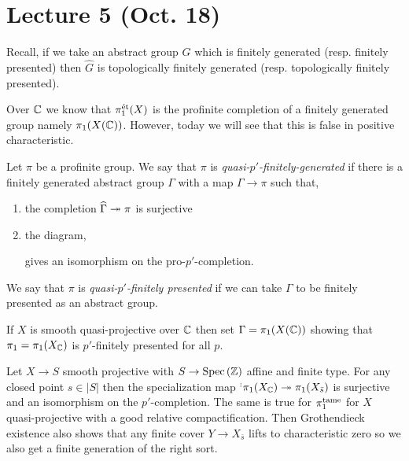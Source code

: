 \documentclass[12pt]{article}
\begin{document}
\section{Lecture 5 (Oct. 18)}

\begin{rmk}
Recall, if we take an abstract group $G$ which is finitely generated (resp. finitely presented) then $\widehat{G}$ is topologically finitely generated (resp. topologically finitely presented). 
\end{rmk}

\begin{prop}
Over $\mathbb{C}$ we know that $\pi_1^{\text{\'{e}t}}(X)$ is the profinite completion of a finitely generated group namely $\pi_1(X(\mathbb{C}))$. However, today we will see that this is false in positive characteristic. 
\end{prop}

\begin{defn}
Let $\pi$ be a profinite group. We say that $\pi$ is \textit{quasi-$p'$-finitely-generated} if there is a finitely generated abstract group $\Gamma$ with a map $\Gamma \to \pi$ such that,
\begin{enumerate}
\item the completion $\widehat{\Gamma} \twoheadrightarrow \pi$ is surjective
\item the diagram,
\begin{center}
\end{center}
gives an isomorphism on the pro-$p'$-completion.
\end{enumerate}
We say that $\pi$ is \textit{quasi-$p'$-finitely presented} if we can take $\Gamma$ to be finitely presented as an abstract group.
\end{defn}

\begin{example}
If $X$ is smooth quasi-projective over $\mathbb{C}$ then set $\Gamma = \pi_1(X(\mathbb{C}))$ showing that $\pi_1 = \pi_1(X_{\mathbb{C}})$ is $p'$-finitely presented for all $p$.
\end{example}

\begin{example}
Let $X \to S$ smooth projective with $S \to \mathrm{Spec}\left( \mathbb{Z} \right)$ affine and finite type. For any closed point $s \in |S|$ then the specialization map $\sp : \pi_1(X_{\mathbb{C}}) \twoheadrightarrow \pi_1(X_{\bar{s}})$ is surjective and an isomorphism on the $p'$-completion. The same is true for $\pi_1^{\mathrm{tame}}$ for $X$ quasi-projective with a good relative compactification. Then Grothendieck existence also shows that any finite \etale cover $Y \to X_{\bar{s}}$ lifts to characteristic zero so we also get a finite generation of the right sort. 
\end{example}
\end{document}
